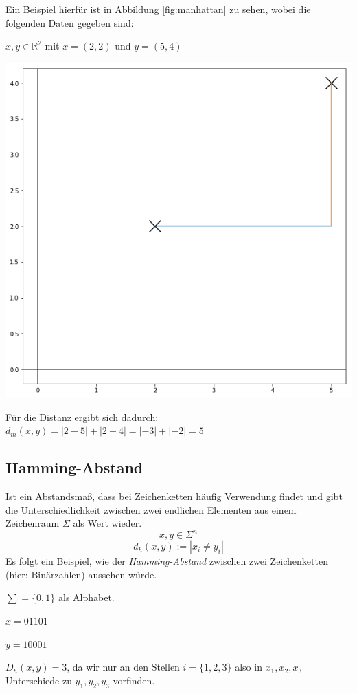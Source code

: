 \documentclass[fontsize=11pt]{scrartcl}
\newenvironment{Figure}
  {\par\medskip\noindent\minipage{\linewidth}}
  {\endminipage\par\medskip}
\begin{document}
                Ein Beispiel hierfür ist in Abbildung \ref{fig:manhattan} zu sehen, wobei die folgenden Daten gegeben sind:\par
                   $x,y \in \mathbb{R}^2$ mit $x= (2, 2)$ und $y= (5,4)$
                \begin{Figure}
                    \centering
                    \includegraphics[scale=0.3]{manhattanDistance.png}
                   \label{fig:manhattan}
                \end{Figure}    
              	Für die Distanz ergibt sich dadurch: $d_m(x,y)= |2-5|+|2-4|=|-3|+|-2|=5$                  

                         
            \subsection{Hamming-Abstand}
                Ist ein Abstandsmaß, dass bei Zeichenketten häufig Verwendung findet und gibt die Unterschiedlichkeit zwischen zwei endlichen Elementen aus einem Zeichenraum $\Sigma$ als Wert wieder.
                $$ x,y \in \Sigma^n $$
	            $$ d_h(x,y):= |x_i \neq y_i |$$
                Es folgt ein Beispiel, wie der \emph{Hamming-Abstand} zwischen zwei Zeichenketten (hier: Binärzahlen) aussehen würde.\par
                $\sum=\{0,1\}$ als Alphabet.\par
                $x = 01101$\par
                $y= 10001$\par
                $D_h(x,y)=3$, da wir nur an den Stellen $i=\{1,2,3\}$ also in $ x_1,x_2,x_3$ Unterschiede zu $y_1,y_2,y_3$ vorfinden.
                        
\end{document}
